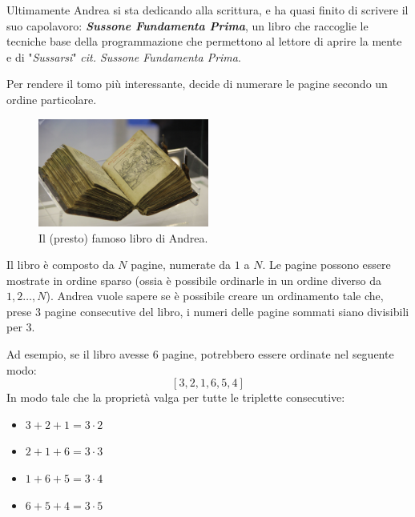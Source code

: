 \usepackage{xcolor}
\usepackage{afterpage}
\usepackage{pifont,mdframed}
\usepackage[bottom]{footmisc}
\usepackage{minted}

\newcommand{\inputfile}{\texttt{stdin}}
\newcommand{\outputfile}{\texttt{stdout}}
\makeatletter
\renewcommand{\this@inputfilename}{\texttt{stdin}}
\renewcommand{\this@outputfilename}{\texttt{stdout}}
\renewcommand{\this@syllabuslevel}{5}
\renewcommand{\this@custdifficulty}{3}
\makeatother

Ultimamente Andrea si sta dedicando alla scrittura, e ha quasi finito di scrivere il suo capolavoro:
\textbf{\textit{Sussone Fundamenta Prima}}, un libro che raccoglie le tecniche base della programmazione
che permettono al lettore di aprire la mente e di "\textit{Sussarsi}" \textit{cit. Sussone Fundamenta Prima}.

Per rendere il tomo più interessante, decide di numerare le pagine secondo un ordine particolare.

\begin{figure}[h]
    \centering
    \includegraphics[width=0.5\textwidth]{susbook.jpg}
    \caption{Il (presto) famoso libro di Andrea.}
\end{figure}

Il libro è composto da $N$ pagine, numerate da $1$ a $N$. Le pagine possono essere mostrate in ordine
sparso (ossia è possibile ordinarle in un ordine diverso da $1,2\dots,N$).
Andrea vuole sapere se è possibile creare un ordinamento tale che, prese $3$ pagine consecutive
del libro, i numeri delle pagine sommati siano divisibili per $3$.

Ad esempio, se il libro avesse $6$ pagine, potrebbero essere ordinate nel seguente modo:
$$[3, 2, 1, 6, 5, 4]$$
In modo tale che la proprietà valga per tutte le triplette consecutive:
\begin{itemize}
    \item $3+2+1 = 3\cdot2$
    \item $2+1+6 = 3\cdot3$
    \item $1+6+5 = 3\cdot4$
    \item $6+5+4 = 3\cdot5$
\end{itemize}

